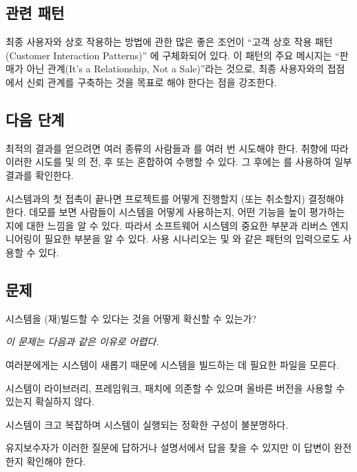 \documentclass[a4paper,10pt,twoside]{book}
\begin{document}
\subsection*{관련 패턴}

최종 사용자와 상호 작용하는 방법에 관한 많은 좋은 조언이 ``고객 상호 작용 패턴(Customer Interaction Patterns)'' \cite{Risi00a}에 구체화되어 있다. 이 패턴의 주요 메시지는 ``판매가 아닌 관계(It's a Relationship, Not a Sale)''라는 것으로, 최종 사용자와의 접점에서 신뢰 관계를 구축하는 것을 목표로 해야 한다는 점을 강조한다.

\subsection*{다음 단계}

최적의 결과를 얻으려면 여러 종류의 사람들과 를 여러 번 시도해야 한다. 취향에 따라 이러한 시도를  및 의 전, 후 또는 혼합하여 수행할 수 있다. 그 후에는 를 사용하여 일부 결과를 확인한다. 

시스템과의 첫 접촉이 끝나면 프로젝트를 어떻게 진행할지 (또는 취소할지) 결정해야 한다. 데모를 보면 사람들이 시스템을 어떻게 사용하는지, 어떤 기능을 높이 평가하는지에 대한 느낌을 알 수 있다. 따라서 소프트웨어 시스템의 중요한 부분과 리버스 엔지니어링이 필요한 부분을 알 수 있다. 사용 시나리오는  및 와 같은 패턴의 입력으로도 사용할 수 있다.



\subsection*{문제}

시스템을 (재)빌드할 수 있다는 것을 어떻게 확신할 수 있는가?

\emph{이 문제는 다음과 같은 이유로 어렵다.}

\begin{bulletlist}
  \item 여러분에게는 시스템이 새롭기 때문에 시스템을 빌드하는 데 필요한 파일을 모른다.

  \item 시스템이 라이브러리, 프레임워크, 패치에 의존할 수 있으며 올바른 버전을 사용할 수 있는지 확실하지 않다.

  \item 시스템이 크고 복잡하며 시스템이 실행되는 정확한 구성이 불분명하다.

  \item 유지보수자가 이러한 질문에 답하거나 설명서에서 답을 찾을 수 있지만 이 답변이 완전한지 확인해야 한다.
\end{bulletlist}
\end{document}
